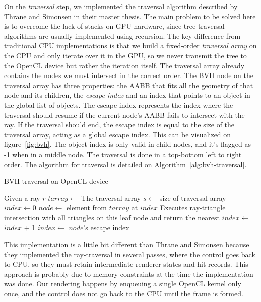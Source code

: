 \documentclass{vgtc}
\begin{document}
On the \emph{traversal} step, we implemented the traversal algorithm
described by Thrane and Simonsen in their master
thesis\cite{Thrane}. The main problem to be solved here is to overcome
the lack of stacks on GPU hardware, since tree traversal algorithms are
usually implemented using recursion. The key difference from
traditional CPU implementations is that we build a fixed-order
\emph{traversal array} on the CPU and only iterate over it in the GPU,
so we never transmit the tree to the OpenCL device but rather the
iteration itself. The traversal array already contains the nodes we
must intersect in the correct order. The BVH node on the traversal
array has three properties: the AABB that fits all the geometry of
that node and its children, the \emph{escape index} and an index that
points to an object in the global list of objects. The escape index
represents the index where the traversal should resume if the current
node's AABB fails to intersect with the ray. If the traversal should
end, the escape index is equal to the size of the traversal array,
acting as a global escape index. This can be visualized on
figure~\ref{fig:bvh}. The object index is only valid in child nodes,
and it's flagged as -1 when in a middle node. The traversal is done in
a top-bottom left to right order. The algorithm for traversal is
detailed on Algorithm~\ref{alg:bvh-traversal}.


\begin{algorithm}
\caption{BVH traversal on OpenCL device}
\label{alg:bvh-traversal}
\begin{algorithmic}[1]
\State Given a ray $r$
\State $tarray\gets$ The traversal array
\State $s\gets$ size of traversal array
\State $index\gets 0$
\State $node\gets$ element from $tarray$ at $index$
\State Executes ray-triangle intersection with all triangles on this leaf node and return the nearest
\Else
\State $index\gets$ $index$ + 1
\EndIf
\Else
\State $index\gets$ $node$'s escape index
\EndIf
\EndWhile
\end{algorithmic}
\end{algorithm}

This implementation is a little bit different than Thrane and Simonsen
because they implemented the ray-traversal in several passes, where
the control goes back to CPU, so they must retain intermediate
renderer states and hit records. This approach is probably due to
memory constraints at the time the implementation was done. Our
rendering happens by enqueuing a single OpenCL kernel only once, and
the control does not go back to the CPU until the frame is formed.
\end{document}
